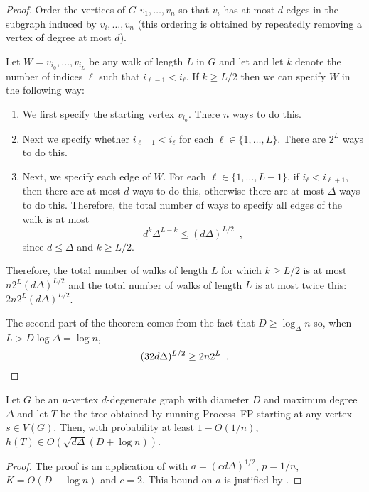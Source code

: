 \documentclass[lotsofwhite]{patmorin}
\begin{document}
\begin{proof}
   Order the vertices of $G$ $v_1,\ldots,v_n$ so that $v_i$ has at most
   $d$ edges in the subgraph induced by $v_i,\ldots,v_n$ (this ordering
   is obtained by repeatedly removing a vertex of degree at most $d$).

   Let $W=v_{i_0},\ldots,v_{i_L}$ be any walk of length $L$ in $G$ and
   let and let $k$ denote the number of indices $\ell$ such that $i_{\ell-1}
   < i_{\ell}$.  
   If $k\ge L/2$ then we can specify $W$ in the following way:
   \begin{enumerate}
     \item We first specify the starting vertex $v_{i_0}$.  There $n$
       ways to do this.
     \item Next we specify whether $i_{\ell-1} < i_{\ell}$ for each
       $\ell\in\{1,\ldots,L\}$.  There are $2^L$ ways to do this.
     \item Next, we specify each edge of $W$.  For each
       $\ell\in\{1,\ldots,L-1\}$, if $i_{\ell} < i_{\ell+1}$,
       then there are at most $d$ ways to do this, otherwise there are at most $\Delta$
       ways to do this.
      Therefore, the total number of ways to specify all edges of the walk
      is at most  
      \[   d^k\Delta^{L-k} \le (d\Delta)^{L/2}  \enspace ,\]
      since $d\le \Delta$ and $k\ge L/2$.
   \end{enumerate}
   Therefore, the total number of walks of length $L$ for which $k\ge
   L/2$ is at most $n2^L(d\Delta)^{L/2}$ and the total number of walks
   of length $L$ is at most twice this: $2n2^L(d\Delta)^{L/2}$.

   The second part of the theorem comes from the fact that $D\ge
   \log_\Delta n$ so, when $L>D\log\Delta=\log n$,
   \[ (32d\Delta)^{L/2} \ge 2n2^L \enspace . \qedhere \]
\end{proof}

\begin{thm}
  Let $G$ be an $n$-vertex $d$-degenerate graph with diameter $D$ and
  maximum degree $\Delta$ and let $T$ be the tree obtained
  by running Process~FP starting at any vertex $s\in V(G)$.  Then,
  with probability at least $1-O(1/n)$, $h(T)\in O(\sqrt{d\Delta}(D+\log n))$.
\end{thm}

\begin{proof}
  The proof is an application of  with
  $a=(cd\Delta)^{1/2}$, $p=1/n$, $K=O(D+\log n)$ and $c=2$. This bound
  on $a$ is justified by .
\end{proof}
\end{document}
